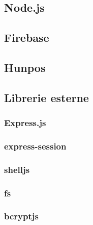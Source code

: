 \subsection{Node.js}
\subsection{Firebase}
\subsection{Hunpos}
\subsection{Librerie esterne}
\subsubsection{Express.js}
\subsubsection{express-session}
\subsubsection{shelljs}
\subsubsection{fs}
\subsubsection{bcryptjs}